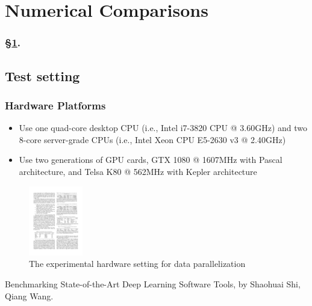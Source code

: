 
\section{Numerical Comparisons}\label{sec:numer}


\frameinlbffalse

\begin{frame}[plain]
\frametitle{\S\ref{sec:numer}. \insertsection}
\listofframes
\end{frame}
\addtocounter{framenumber}{-1} %

\frameinlbftrue


\subsection{Test setting}

\begin{frame}
	\MyLogo
	\frametitle{Hardware Platforms}  

\begin{itemize}

\item Use one quad-core desktop CPU (i.e., Intel i7-3820 CPU
		@ 3.60GHz) and two 8-core server-grade CPUs (i.e., Intel
		Xeon CPU E5-2630 v3 @ 2.40GHz)
		
\item Use two generations of GPU cards, GTX 1080 @ 1607MHz with
		Pascal architecture, and Telsa K80 @ 562MHz with Kepler
		architecture 
	\end{itemize}
	
\begin{figure}[htbp] 
	\includegraphics[height=1.2in]{figures/platforms.pdf} 
	\caption{The experimental hardware setting for data parallelization}
\end{figure}
	
\begin{center}
	{\color{red} \scriptsize
		Benchmarking State-of-the-Art Deep Learning Software Tools, by Shaohuai Shi, Qiang Wang.}
\end{center}

\end{frame}

